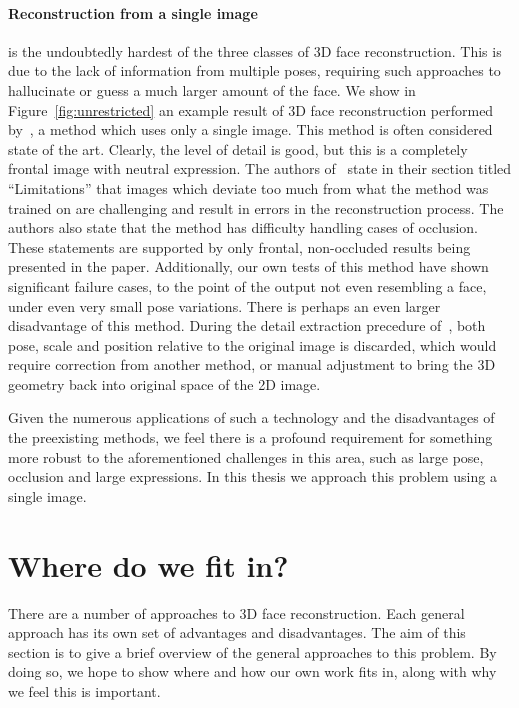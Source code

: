 \paragraph{Reconstruction from a single image} is the undoubtedly
hardest of the three classes of 3D face reconstruction. This is due to
the lack of information from multiple poses, requiring such approaches
to hallucinate or guess a much larger amount of the face. We show in
Figure~\ref{fig:unrestricted} an example result of 3D face
reconstruction performed by~\cite{sela2017unrestricted}, a method
which uses only a single image. This method is often considered state
of the art. Clearly, the level of detail is good, but this is a
completely frontal image with neutral expression. The authors
of~\cite{sela2017unrestricted} state in their section titled
``Limitations'' that images which deviate too much from what the
method was trained on are challenging and result in errors in the
reconstruction process. The authors also state that the method has
difficulty handling cases of occlusion. These statements are supported
by only frontal, non-occluded results being presented in the
paper. Additionally, our own tests of this method have shown
significant failure cases, to the point of the output not even
resembling a face, under even very small pose variations. There is
perhaps an even larger disadvantage of this method. During the detail
extraction precedure of~\cite{sela2017unrestricted}, both pose, scale
and position relative to the original image is discarded, which would
require correction from another method, or manual adjustment to bring
the 3D geometry back into original space of the 2D image.

Given the numerous applications of such a technology and the
disadvantages of the preexisting methods, we feel there is a profound
requirement for something more robust to the aforementioned challenges
in this area, such as large pose, occlusion and large expressions. In
this thesis we approach this problem using a single image.

\section{Where do we fit in?}

There are a number of approaches to 3D face reconstruction. Each
general approach has its own set of advantages and disadvantages. The
aim of this section is to give a brief overview of the general
approaches to this problem. By doing so, we hope to show where and how
our own work fits in, along with why we feel this is important.

